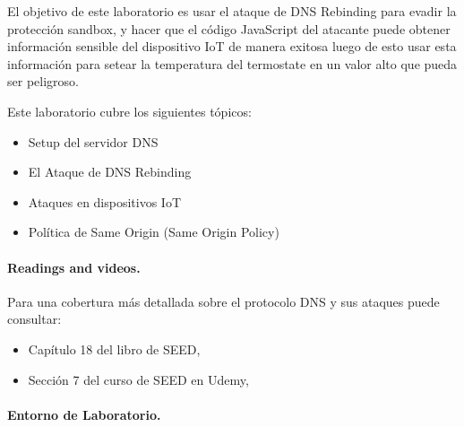 El objetivo de este laboratorio es usar el ataque de DNS Rebinding para evadir la protección sandbox, y hacer que el código JavaScript del atacante puede obtener información sensible del dispositivo IoT de manera exitosa luego de esto usar esta información para setear la temperatura del termostate en un valor alto que pueda ser peligroso. 

Este laboratorio cubre los siguientes tópicos:

\begin{itemize}[noitemsep]
\item Setup del servidor DNS
\item El Ataque de DNS Rebinding 
\item Ataques en dispositivos IoT
\item Política de Same Origin  (Same Origin Policy)
\end{itemize}


\paragraph{Readings and videos.}
Para una cobertura más detallada sobre el protocolo DNS y sus ataques puede consultar:

\begin{itemize}
\item Capítulo 18 del libro de SEED, \seedbook
\item Sección 7 del curso de SEED en Udemy, \seedisvideo
\end{itemize}


\paragraph{Entorno de Laboratorio.} \seedenvironmentC








